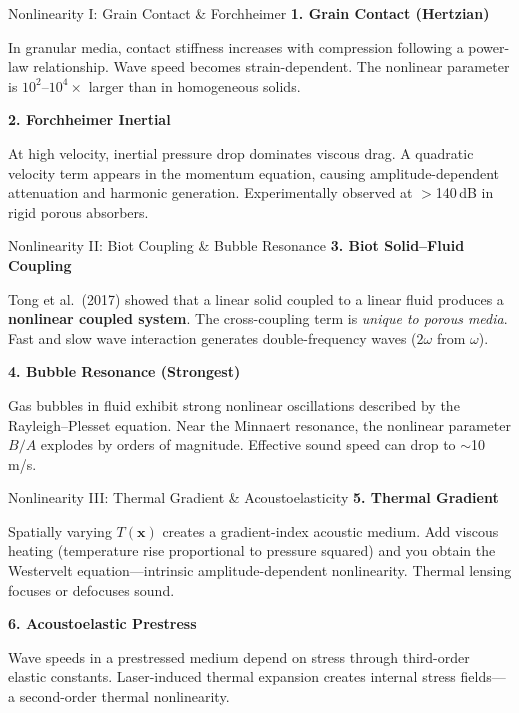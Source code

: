\documentclass[aspectratio=169,11pt]{beamer}
\begin{document}
\begin{frame}{Nonlinearity I: Grain Contact \& Forchheimer}
  \textbf{1. Grain Contact (Hertzian)}

  In granular media, contact stiffness increases with compression following a power-law relationship. Wave speed becomes strain-dependent. The nonlinear parameter is $10^2$--$10^4\times$ larger than in homogeneous solids.

  \vspace{0.3cm}
  \textbf{2. Forchheimer Inertial}

  At high velocity, inertial pressure drop dominates viscous drag. A quadratic velocity term appears in the momentum equation, causing amplitude-dependent attenuation and harmonic generation. Experimentally observed at $>$140\,dB in rigid porous absorbers.
\end{frame}

\begin{frame}{Nonlinearity II: Biot Coupling \& Bubble Resonance}
  \textbf{3. Biot Solid--Fluid Coupling}

  Tong et al.\ (2017) showed that a linear solid coupled to a linear fluid produces a \textbf{nonlinear coupled system}. The cross-coupling term is \textit{unique to porous media}. Fast and slow wave interaction generates double-frequency waves ($2\omega$ from $\omega$).

  \vspace{0.3cm}
  \textbf{4. Bubble Resonance (Strongest)}

  Gas bubbles in fluid exhibit strong nonlinear oscillations described by the Rayleigh--Plesset equation. Near the Minnaert resonance, the nonlinear parameter $B/A$ explodes by orders of magnitude. Effective sound speed can drop to $\sim$10\,m/s.
\end{frame}

\begin{frame}{Nonlinearity III: Thermal Gradient \& Acoustoelasticity}
  \textbf{5. Thermal Gradient}

  Spatially varying $T(\mathbf{x})$ creates a gradient-index acoustic medium. Add viscous heating (temperature rise proportional to pressure squared) and you obtain the Westervelt equation---intrinsic amplitude-dependent nonlinearity. Thermal lensing focuses or defocuses sound.

  \vspace{0.3cm}
  \textbf{6. Acoustoelastic Prestress}

  Wave speeds in a prestressed medium depend on stress through third-order elastic constants. Laser-induced thermal expansion creates internal stress fields---a second-order thermal nonlinearity.
\end{frame}
\end{document}
